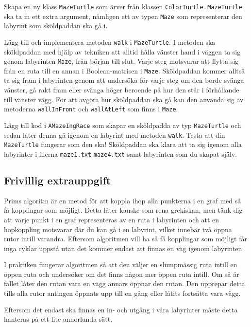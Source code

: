 \Subtask Skapa en ny klass \texttt{MazeTurtle} som ärver från klassen \texttt{ColorTurtle}. \texttt{MazeTurtle} ska ta in ett extra argument, nämligen ett av typen \texttt{Maze} som representerar den labyrint som sköldpaddan ska gå i.

\Subtask Lägg till och implementera metoden \texttt{walk} i \texttt{MazeTurtle}. I metoden ska sköldpaddan med hjälp av tekniken att alltid hålla vänster hand i väggen ta sig genom labyrinten \texttt{Maze}, från början till slut. Varje steg motsvarar att flytta sig från en ruta till en annan i Boolean-matrisen i \texttt{Maze}. Sköldpaddan kommer alltså ta sig fram i labyrinten genom att undersöka för varje steg om den borde svänga vänster, gå rakt fram eller svänga höger beroende på hur den står i förhållande till vänster vägg. För att avgöra hur sköldpaddan ska gå kan den använda sig av metoderna \texttt{wallInFront} och \texttt{wallAtLeft} som finns i \texttt{Maze}.

\Subtask Lägg till kod i \texttt{AMazeIngRace} som skapar en sköldpadda av typ \texttt{MazeTurtle} och sedan låter denna gå igenom en labyrint med metoden \texttt{walk}. Testa att din \texttt{MazeTurtle} fungerar som den ska! Sköldpaddan ska klara att ta sig igenom alla labyrinter i filerna \texttt{maze1.txt}-\texttt{maze4.txt} samt labyrinten som du skapat själv.


\subsection{Frivillig extrauppgift}


Prims algoritm är en metod för att koppla ihop alla punkterna i en graf med så få kopplingar som möjligt. Detta låter kanske som rena grekiskan, men tänk dig att varje punkt i en graf representeras av en ruta i labyrinten och att en hopkoppling motsvarar där du kan gå i en labyrint, vilket innebär två öppna rutor intill varandra. Eftersom algoritmen vill ha så få kopplingar som möjligt får inga cyklar uppstå utan det kommer endast att finnas en väg igenom labyrinten

I praktiken fungerar algoritmen så att den väljer en slumpmässig ruta intill en öppen ruta och undersöker om det finns någon mer öppen ruta intill. Om så är fallet låter den rutan vara en vägg annars öppnar den rutan. Den upprepar detta tills alla rutor antingen öppnats upp till en gång eller låtits fortsätta vara vägg.

Eftersom det endast ska finnas en in- och utgång i våra labyrinter måste detta hanteras på ett lite annorlunda sätt.

